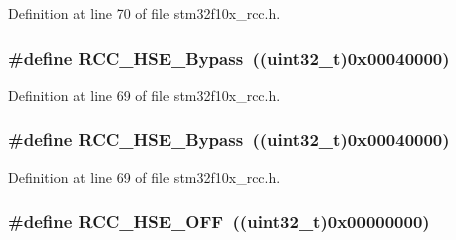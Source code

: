 Definition at line 70 of file stm32f10x\+\_\+rcc.\+h.

\subsubsection[{\texorpdfstring{R\+C\+C\+\_\+\+H\+S\+E\+\_\+\+Bypass}{RCC_HSE_Bypass}}]{\setlength{\rightskip}{0pt plus 5cm}\#define R\+C\+C\+\_\+\+H\+S\+E\+\_\+\+Bypass~(({\bf uint32\+\_\+t})0x00040000)}\hypertarget{group___h_s_e__configuration_ga09061e9909d5f588baa7bfb0f7edd9fa}{}\label{group___h_s_e__configuration_ga09061e9909d5f588baa7bfb0f7edd9fa}


Definition at line 69 of file stm32f10x\+\_\+rcc.\+h.

\subsubsection[{\texorpdfstring{R\+C\+C\+\_\+\+H\+S\+E\+\_\+\+Bypass}{RCC_HSE_Bypass}}]{\setlength{\rightskip}{0pt plus 5cm}\#define R\+C\+C\+\_\+\+H\+S\+E\+\_\+\+Bypass~(({\bf uint32\+\_\+t})0x00040000)}\hypertarget{group___h_s_e__configuration_ga09061e9909d5f588baa7bfb0f7edd9fa}{}\label{group___h_s_e__configuration_ga09061e9909d5f588baa7bfb0f7edd9fa}


Definition at line 69 of file stm32f10x\+\_\+rcc.\+h.

\subsubsection[{\texorpdfstring{R\+C\+C\+\_\+\+H\+S\+E\+\_\+\+O\+FF}{RCC_HSE_OFF}}]{\setlength{\rightskip}{0pt plus 5cm}\#define R\+C\+C\+\_\+\+H\+S\+E\+\_\+\+O\+FF~(({\bf uint32\+\_\+t})0x00000000)}\hypertarget{group___h_s_e__configuration_ga1616626d23fbce440398578855df6f97}{}\label{group___h_s_e__configuration_ga1616626d23fbce440398578855df6f97}


